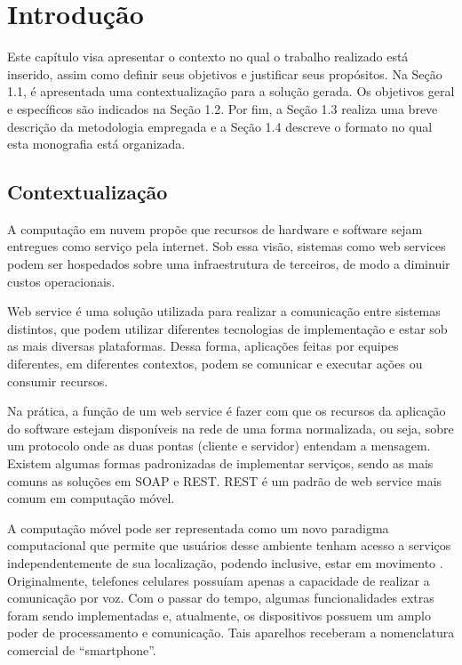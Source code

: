 \chapter{Introdução} \label{CHP:TEO}%
Este capítulo visa apresentar o contexto no qual o trabalho realizado está inserido, assim como definir seus objetivos e justificar seus propósitos. Na Seção 1.1, é apresentada uma contextualização para a solução gerada. Os objetivos geral e específicos são indicados na Seção 1.2. Por fim, a Seção 1.3 realiza uma breve descrição da metodologia empregada e a Seção 1.4 descreve o formato no qual esta monografia está organizada.
 
\section{Contextualização}
 
        A computação em nuvem propõe que recursos de hardware e software sejam entregues como serviço pela internet. Sob essa visão, sistemas como web services podem ser hospedados sobre uma infraestrutura de terceiros, de modo a diminuir custos operacionais.

		Web service é uma solução utilizada para realizar a comunicação entre sistemas distintos, que podem utilizar diferentes tecnologias de implementação e estar sob as mais diversas plataformas.  Dessa forma, aplicações feitas por equipes diferentes, em diferentes contextos, podem se comunicar e executar ações ou consumir recursos.
		
		
        Na prática, a função de um web service é fazer com que os recursos da aplicação do software estejam disponíveis na rede de uma forma normalizada, ou seja, sobre um protocolo onde as duas pontas (cliente e servidor) entendam a mensagem.
        Existem algumas formas padronizadas de implementar serviços, sendo as mais comuns as soluções em \ac{SOAP} e \ac{REST}. \ac{REST} é um padrão de web service mais comum em computação móvel.
		
        A computação móvel pode ser representada como um novo paradigma computacional que permite que usuários desse ambiente tenham acesso a serviços independentemente de sua localização, podendo inclusive, estar em movimento \cite {fucapi}. Originalmente, telefones celulares possuíam apenas a capacidade de realizar a comunicação por voz. Com o passar do tempo, algumas funcionalidades extras foram sendo implementadas e, atualmente, os dispositivos possuem um amplo poder de processamento e comunicação. Tais aparelhos receberam a nomenclatura comercial de ``smartphone''.
		
